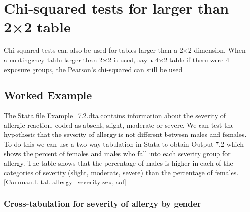 \documentclass[
]{memoir}
\begin{document}
\hypertarget{chi-squared-tests-for-larger-than-22-table}{%
\section{Chi-squared tests for larger than 2×2 table}\label{chi-squared-tests-for-larger-than-22-table}}

Chi-squared tests can also be used for tables larger than a 2×2 dimension. When a contingency table larger than 2×2 is used, say a 4×2 table if there were 4 exposure groups, the Pearson's chi-squared can still be used.

\hypertarget{worked-example-10}{%
\subsection{Worked Example}\label{worked-example-10}}

The Stata file Example\_7.2.dta contains information about the severity of allergic reaction, coded as absent, slight, moderate or severe. We can test the hypothesis that the severity of allergy is not different between males and females. To do this we can use a two-way tabulation in Stata to obtain Output 7.2 which shows the percent of females and males who fall into each severity group for allergy. The table shows that the percentage of males is higher in each of the categories of severity (slight, moderate, severe) than the percentage of females. {[}Command: tab allergy\_severity sex, col{]}

\hypertarget{cross-tabulation-for-severity-of-allergy-by-gender}{%
\subsubsection{Cross-tabulation for severity of allergy by gender}\label{cross-tabulation-for-severity-of-allergy-by-gender}}
\end{document}
